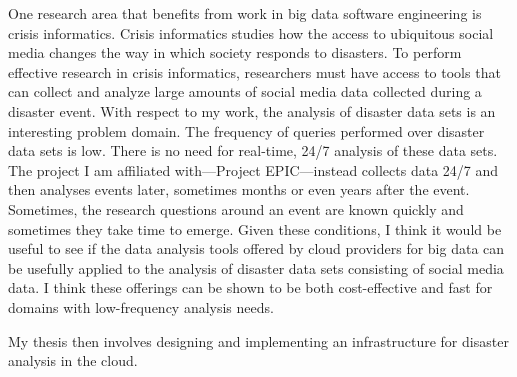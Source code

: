 One research area that benefits from work in big data software engineering is crisis informatics. Crisis informatics studies how the access to ubiquitous social media changes the way in which society responds to disasters. To perform effective research in crisis informatics, researchers must have access to tools that can collect and analyze large amounts of social media data collected during a disaster event. With respect to my work, the analysis of disaster data sets is an interesting problem domain. The frequency of queries performed over disaster data sets is low. There is no need for real-time, 24/7 analysis of these data sets. The project I am affiliated with---Project EPIC---instead collects data 24/7 and then analyses events later, sometimes months or even years after the event. Sometimes, the research questions around an event are known quickly and sometimes they take time to emerge. Given these conditions, I think it would be useful to see if the data analysis tools offered by cloud providers for big data can be usefully applied to the analysis of disaster data sets consisting of social media data. I think these offerings can be shown to be  both cost-effective and fast for domains with low-frequency analysis needs.

My thesis then involves designing and implementing an infrastructure for disaster analysis in the cloud.

